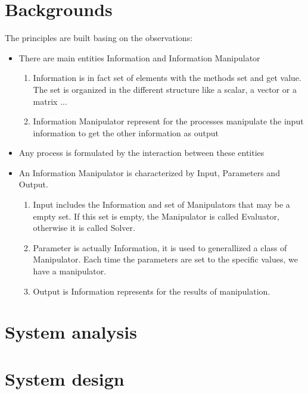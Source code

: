 \documentclass{report}
\begin{document}
\chapter{Backgrounds}
\par The principles are built basing on the observations:
\begin{itemize}
  \item There are main entities Information and Information Manipulator
    \begin{enumerate}
    \item Information is in fact set of elements with the methods set and get value. The 
      set is organized in the different structure like a scalar, a vector or a matrix ...
    \item Information Manipulator represent for the processes manipulate the input information to
      get the other information as output
    \end{enumerate}
  \item Any process is formulated by the interaction between these entities
  \item An Information Manipulator is characterized by Input, Parameters and Output.
    \begin{enumerate}
    \item Input includes the Information and set of Manipulators that may 
      be a empty set. If this set is empty, the Manipulator is called Evaluator, otherwise
      it is called Solver. 
    \item Parameter is actually Information, it is used to generallized a class of Manipulator.
      Each time the parameters are set to the specific values, we have a manipulator.
    \item Output is Information represents for the results of manipulation.
    \end{enumerate}
\end{itemize}

\chapter{System analysis}
\chapter{System design}
\chapter{}
\end{document}
